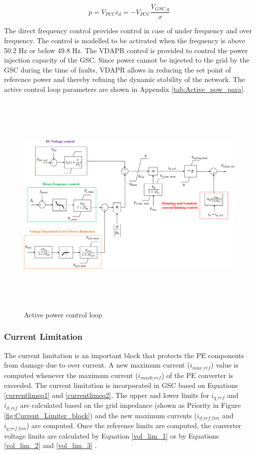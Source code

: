 \begin{equation}\label{P_eq}
    p = V_{PCC}i_d = -V_{PCC}\frac{V_{GSC\_q}}{x}
\end{equation}

The direct frequency control provides control in case of under frequency and over frequency. The control is modelled to be activated when the frequency is above 50.2 Hz or below 49.8 Hz.
The \gls{VDAPR} control is provided to control the power injection capacity of the \gls{GSC}. Since power cannot be injected to the grid by the \gls{GSC} during the time of faults, \gls{VDAPR} allows in reducing the set point of reference power and thereby refining the dynamic stability of the network. The active control loop parameters are shown in Appendix \ref{tab:Active_pow_para}.

\begin{figure}[H]
\centering
    \includegraphics[height = 11cm,width = \textwidth]{Diagrams/Chapter_3/Active_power_loop.pdf}
    \caption{Active power control loop \cite{korai_dynamic_2019}}
    \label{fig:Active_Power_Control_Loop}
\end{figure}

\subsubsection{Current Limitation}\label{currentlimitation_RSCAD}
The current limitation is an important block that protects the \gls{PE} components from damage due to over current. A new maximum current ($i_{max\_ref}$) value is computed whenever the maximum current ($i_{max0\_ref}$) of the \gls{PE} converter is exceeded. The current limitation is incorporated in \gls{GSC} based on Equations \ref{currentlimeq1} and \ref{currentlimeq2}. The upper and lower limits for $i_{q\_ref}$ and $i_{d\_ref}$ are calculated based on the grid impedance (shown as Priority in Figure \ref{fig:Current_Limiter_block}) and the new maximum currents ($i_{d\_ref\_lim}$ and $i_{q\_ref\_lim}$) are computed. 
Once the reference limits are computed, the converter voltage limits are calculated by Equation \ref{vol_lim_1} or by Equations \ref{vol_lim_2} and \ref{vol_lim_3} \cite{korai_dynamic_2019}.

